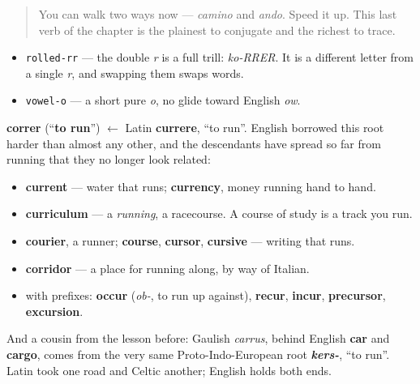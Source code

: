 \begin{quote}
You can walk two ways now — \emph{camino} and \emph{ando}. Speed it up. This last verb of the chapter is the plainest to conjugate and the richest to trace.
\end{quote}

\begin{sounds}
\begin{itemize}
\raggedright
  \item \texttt{rolled-rr} — the double \emph{r} is a full trill: \emph{ko-RRER}. It is a different letter from a single \emph{r}, and swapping them swaps words.
  \item \texttt{vowel-o} — a short pure \emph{o}, no glide toward English \emph{ow}.
\end{itemize}
\end{sounds}

\begin{cousinweb}
\textbf{correr} (\textquotedblleft{}\textbf{to run}\textquotedblright{}) $\leftarrow$ Latin \textbf{currere}, \textquotedblleft{}to run\textquotedblright{}. English borrowed this root harder than almost any other, and the descendants have spread so far from running that they no longer look related:

\begin{itemize}
\raggedright
  \item \textbf{current} — water that runs; \textbf{currency}, money running hand to hand.
  \item \textbf{curriculum} — a \emph{running}, a racecourse. A course of study is a track you run.
  \item \textbf{courier}, a runner; \textbf{course}, \textbf{cursor}, \textbf{cursive} — writing that runs.
  \item \textbf{corridor} — a place for running along, by way of Italian.
  \item with prefixes: \textbf{occur} (\emph{ob-}, to run up against), \textbf{recur}, \textbf{incur}, \textbf{precursor}, \textbf{excursion}.
\end{itemize}

And a cousin from the lesson before: Gaulish \emph{carrus}, behind English \textbf{car} and \textbf{cargo}, comes from the very same Proto-Indo-European root \emph{\textbf{kers-}}, \textquotedblleft{}to run\textquotedblright{}. Latin took one road and Celtic another; English holds both ends.
\end{cousinweb}

